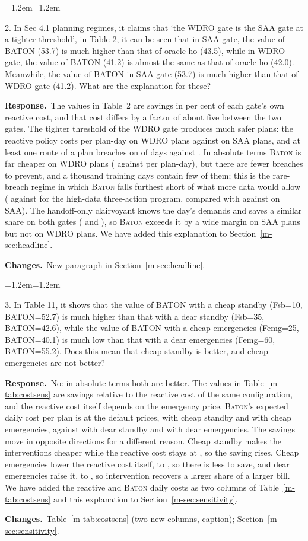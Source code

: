 \documentclass[11pt]{article}
\newenvironment{comment}{\par\medskip\noindent\color{rev}\itshape
  \begin{list}{}{\leftmargin=1.2em\rightmargin=1.2em}\item[]}%
  {\end{list}\par}
\newcommand{\resp}{\par\noindent\textbf{Response.}\ }
\newcommand{\chg}{\par\noindent\textbf{Changes.}\ }
\newcommand{\sref}[1]{Section~\ref{m-#1}}
\newcommand{\tref}[1]{Table~\ref{m-#1}}
\newcommand{\BATON}{\textsc{Baton}}
\begin{document}
\begin{comment}
2. In Sec 4.1 planning regimes, it claims that `the WDRO gate is the SAA
gate at a tighter threshold', in Table 2, it can be seen that in SAA
gate, the value of BATON (53.7) is much higher than that of oracle-ho
(43.5), while in WDRO gate, the value of BATON (41.2) is almost the same
as that of oracle-ho (42.0). Meanwhile, the value of BATON in SAA gate
(53.7) is much higher than that of WDRO gate (41.2). What are the
explanation for these?
\end{comment}
\resp The values in Table~2 are savings in per cent of each gate's own
reactive cost, and that cost differs by a factor of about five between
the two gates. The tighter threshold of the \textsc{WDRO} gate produces
much safer plans: the reactive policy costs \reactWDRO{} per plan-day on
\textsc{WDRO} plans against \reactSAA{} on \textsc{SAA} plans, and at
least one route of a plan breaches on \pemWDRO{} of days against
\pemSAA. In absolute terms \BATON{} is far cheaper on \textsc{WDRO} plans
(\costWDROBaton{} against \costSAABaton{} per plan-day), but there are
fewer breaches to prevent, and a thousand training days contain few of
them; this is the rare-breach regime in which \BATON{} falls furthest
short of what more data would allow (\svWDROBaton{} against
\svWDRODpThree{} for the high-data three-action program, compared with
\svSAABaton{} against \svSAADpThree{} on \textsc{SAA}). The handoff-only
clairvoyant knows the day's demands and saves a similar share on both
gates (\svWDROOrc{} and \svSAAOrc), so \BATON{} exceeds it by a wide
margin on \textsc{SAA} plans but not on \textsc{WDRO} plans. We have
added this explanation to \sref{sec:headline}.
\chg New paragraph in \sref{sec:headline}.

\begin{comment}
3. In Table 11, it shows that the value of BATON with a cheap standby
(Fsb=10, BATON=52.7) is much higher than that with a dear standby
(Fsb=35, BATON=42.6), while the value of BATON with a cheap emergencies
(Femg=25, BATON=40.1) is much low than that with a dear emergencies
(Femg=60, BATON=55.2). Does this mean that cheap standby is better, and
cheap emergencies are not better?
\end{comment}
\resp No: in absolute terms both are better. The values in
\tref{tab:costsens} are savings relative to the reactive cost of the
same configuration, and the reactive cost itself depends on the
emergency price. \BATON's expected daily cost per plan is \csBaseBaton{}
at the default prices, \csSbLowBaton{} with cheap standby and
\csEmgLowBaton{} with cheap emergencies, against \csSbHighBaton{} with
dear standby and \csEmgHighBaton{} with dear emergencies. The savings
move in opposite directions for a different reason. Cheap standby makes
the interventions cheaper while the reactive cost stays at
\csBaseReact{}, so the saving rises. Cheap emergencies lower the
reactive cost itself, to \csEmgLowReact, so there is less to save, and
dear emergencies raise it, to \csEmgHighReact, so intervention recovers
a larger share of a larger bill. We have added the reactive and
\BATON{} daily costs as two columns of \tref{tab:costsens} and this
explanation to \sref{sec:sensitivity}.
\chg \tref{tab:costsens} (two new columns, caption);
\sref{sec:sensitivity}.
\end{document}
